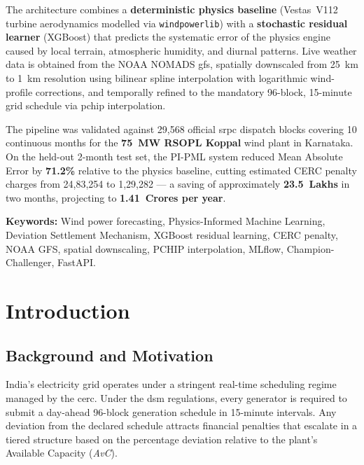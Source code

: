 \documentclass[12pt,a4paper]{report}
\begin{document}
The architecture combines a \textbf{deterministic physics baseline} (Vestas~V112 turbine
aerodynamics modelled via \texttt{windpowerlib}) with a \textbf{stochastic residual learner}
(XGBoost) that predicts the systematic error of the physics engine caused by local terrain,
atmospheric humidity, and diurnal patterns. Live weather data is obtained from the NOAA
NOMADS \gls{gfs}, spatially downscaled from 25~km to 1~km resolution using bilinear spline
interpolation with logarithmic wind-profile corrections, and temporally refined to the
mandatory 96-block, 15-minute grid schedule via \gls{pchip} interpolation.

The pipeline was validated against 29,568 official \gls{srpc} dispatch blocks covering
10 continuous months for the \textbf{75~MW RSOPL Koppal} wind plant in Karnataka. On the
held-out 2-month test set, the PI-PML system reduced Mean Absolute Error by \textbf{71.2\%}
relative to the physics baseline, cutting estimated CERC penalty charges from
\textnumero{}24,83,254 to \textnumero{}1,29,282 --- a saving of approximately
\textbf{\textnumero{}23.5~Lakhs} in two months, projecting to \textbf{\textnumero{}1.41~Crores
per year}.

\vspace{0.5cm}
\noindent\textbf{Keywords:} Wind power forecasting, Physics-Informed Machine Learning,
Deviation Settlement Mechanism, XGBoost residual learning, CERC penalty, NOAA GFS,
spatial downscaling, PCHIP interpolation, MLflow, Champion-Challenger, FastAPI.

\tableofcontents
\listoffigures
\listoftables
\printglossary[type=\acronymtype, title=List of Abbreviations]

\chapter{Introduction}
\onehalfspacing

\section{Background and Motivation}

India's electricity grid operates under a stringent real-time scheduling regime managed by
the \gls{cerc}. Under the \gls{dsm} regulations, every generator is required to submit a
day-ahead 96-block generation schedule in 15-minute intervals. Any deviation from the
declared schedule attracts financial penalties that escalate in a tiered structure based on the
percentage deviation relative to the plant's Available Capacity (\textit{AvC}).
\end{document}
